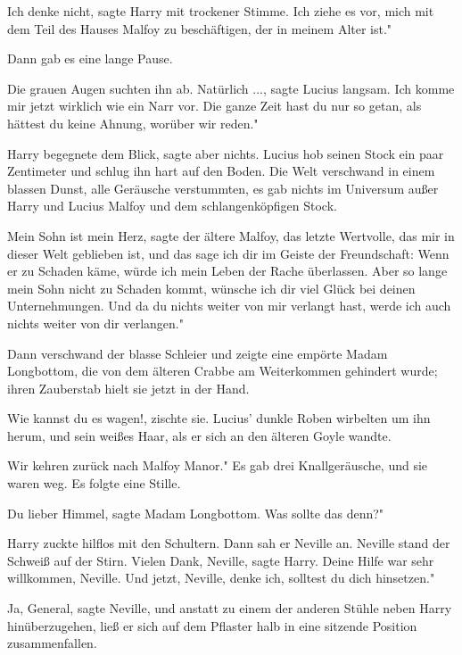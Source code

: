 \glqq{}Ich denke nicht\grqq{}, sagte Harry mit trockener Stimme. \glqq{}Ich
ziehe es vor, mich mit dem Teil des Hauses Malfoy zu beschäftigen, der in meinem
Alter ist."

Dann gab es eine lange Pause.

Die grauen Augen suchten ihn ab. \glqq{}Natürlich ...\grqq{}, sagte Lucius
langsam. \glqq{}Ich komme mir jetzt wirklich wie ein Narr vor. Die ganze Zeit
hast du nur so getan, als hättest du keine Ahnung, worüber wir reden."

Harry begegnete dem Blick, sagte aber nichts. Lucius hob seinen Stock ein paar
Zentimeter und schlug ihn hart auf den Boden. Die Welt verschwand in einem
blassen Dunst, alle Geräusche verstummten, es gab nichts im Universum außer
Harry und Lucius Malfoy und dem schlangenköpfigen Stock.

\glqq{}Mein Sohn ist mein Herz\grqq{}, sagte der ältere Malfoy, \glqq{}das
letzte Wertvolle, das mir in dieser Welt geblieben ist, und das sage ich dir im
Geiste der Freundschaft: Wenn er zu Schaden käme, würde ich mein Leben der Rache
überlassen. Aber so lange mein Sohn nicht zu Schaden kommt, wünsche ich dir viel
Glück bei deinen Unternehmungen. Und da du nichts weiter von mir verlangt hast,
werde ich auch nichts weiter von dir verlangen."

Dann verschwand der blasse Schleier und zeigte eine empörte Madam Longbottom,
die von dem älteren Crabbe am Weiterkommen gehindert wurde; ihren Zauberstab
hielt sie jetzt in der Hand.

\glqq{}Wie kannst du es wagen!\grqq{}, zischte sie. Lucius' dunkle Roben
wirbelten um ihn herum, und sein weißes Haar, als er sich an den älteren Goyle
wandte.

\glqq{}Wir kehren zurück nach Malfoy Manor." Es gab drei Knallgeräusche, und sie
waren weg. Es folgte eine Stille.

\glqq{}Du lieber Himmel\grqq{}, sagte Madam Longbottom. \glqq{}Was sollte das
denn?"

Harry zuckte hilflos mit den Schultern. Dann sah er Neville an. Neville stand
der Schweiß auf der Stirn. \glqq{}Vielen Dank, Neville\grqq{}, sagte Harry.
\glqq Deine Hilfe war sehr willkommen, Neville. Und jetzt, Neville, denke ich,
solltest du dich hinsetzen."

\glqq{}Ja, General\grqq{}, sagte Neville, und anstatt zu einem der anderen
Stühle neben Harry hinüberzugehen, ließ er sich auf dem Pflaster halb in eine
sitzende Position zusammenfallen.

